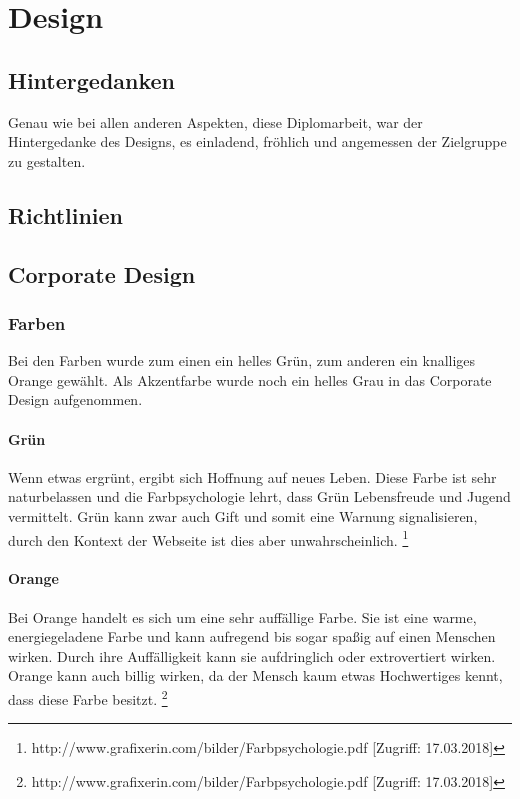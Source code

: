 \chapter{Design}

\section{Hintergedanken}
Genau wie bei allen anderen Aspekten, diese Diplomarbeit, war der Hintergedanke des Designs, es einladend, fröhlich und angemessen der Zielgruppe zu gestalten.

\section{Richtlinien}
\section{Corporate Design}
\subsection{Farben}
Bei den Farben wurde zum einen ein helles Grün, zum anderen ein knalliges Orange gewählt. Als Akzentfarbe wurde noch ein helles Grau in das Corporate Design aufgenommen.

\subsubsection{Grün}
Wenn etwas ergrünt, ergibt sich Hoffnung auf neues Leben. Diese Farbe ist sehr naturbelassen und die Farbpsychologie lehrt, dass Grün Lebensfreude und Jugend vermittelt. Grün kann zwar auch Gift und somit eine Warnung signalisieren, durch den Kontext der Webseite ist dies aber unwahrscheinlich. \footnote{\label{foot:1} http://www.grafixerin.com/bilder/Farbpsychologie.pdf [Zugriff: 17.03.2018]}

\subsubsection{Orange}
Bei Orange handelt es sich um eine sehr auffällige Farbe. Sie ist eine warme, energiegeladene Farbe und kann aufregend bis sogar spaßig auf einen Menschen wirken. Durch ihre Auffälligkeit kann sie aufdringlich oder extrovertiert wirken. Orange kann auch billig wirken, da der Mensch kaum etwas Hochwertiges kennt, dass diese Farbe besitzt. \footnote{\label{foot:1} http://www.grafixerin.com/bilder/Farbpsychologie.pdf [Zugriff: 17.03.2018]}

